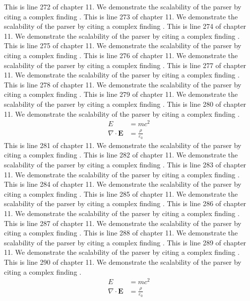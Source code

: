 This is line 272 of chapter 11. We demonstrate the scalability of the parser by citing a complex finding \cite{ref11_272}.
This is line 273 of chapter 11. We demonstrate the scalability of the parser by citing a complex finding \cite{ref11_273}.
This is line 274 of chapter 11. We demonstrate the scalability of the parser by citing a complex finding \cite{ref11_274}.
This is line 275 of chapter 11. We demonstrate the scalability of the parser by citing a complex finding \cite{ref11_275}.
This is line 276 of chapter 11. We demonstrate the scalability of the parser by citing a complex finding \cite{ref11_276}.
This is line 277 of chapter 11. We demonstrate the scalability of the parser by citing a complex finding \cite{ref11_277}.
This is line 278 of chapter 11. We demonstrate the scalability of the parser by citing a complex finding \cite{ref11_278}.
This is line 279 of chapter 11. We demonstrate the scalability of the parser by citing a complex finding \cite{ref11_279}.
This is line 280 of chapter 11. We demonstrate the scalability of the parser by citing a complex finding \cite{ref11_280}.
\begin{align*}
  E &= mc^2 \\
  \nabla \cdot \mathbf{E} &= \frac{\rho}{\varepsilon_0}
\end{align*}
This is line 281 of chapter 11. We demonstrate the scalability of the parser by citing a complex finding \cite{ref11_281}.
This is line 282 of chapter 11. We demonstrate the scalability of the parser by citing a complex finding \cite{ref11_282}.
This is line 283 of chapter 11. We demonstrate the scalability of the parser by citing a complex finding \cite{ref11_283}.
This is line 284 of chapter 11. We demonstrate the scalability of the parser by citing a complex finding \cite{ref11_284}.
This is line 285 of chapter 11. We demonstrate the scalability of the parser by citing a complex finding \cite{ref11_285}.
This is line 286 of chapter 11. We demonstrate the scalability of the parser by citing a complex finding \cite{ref11_286}.
This is line 287 of chapter 11. We demonstrate the scalability of the parser by citing a complex finding \cite{ref11_287}.
This is line 288 of chapter 11. We demonstrate the scalability of the parser by citing a complex finding \cite{ref11_288}.
This is line 289 of chapter 11. We demonstrate the scalability of the parser by citing a complex finding \cite{ref11_289}.
This is line 290 of chapter 11. We demonstrate the scalability of the parser by citing a complex finding \cite{ref11_290}.
\begin{align*}
  E &= mc^2 \\
  \nabla \cdot \mathbf{E} &= \frac{\rho}{\varepsilon_0}
\end{align*}
